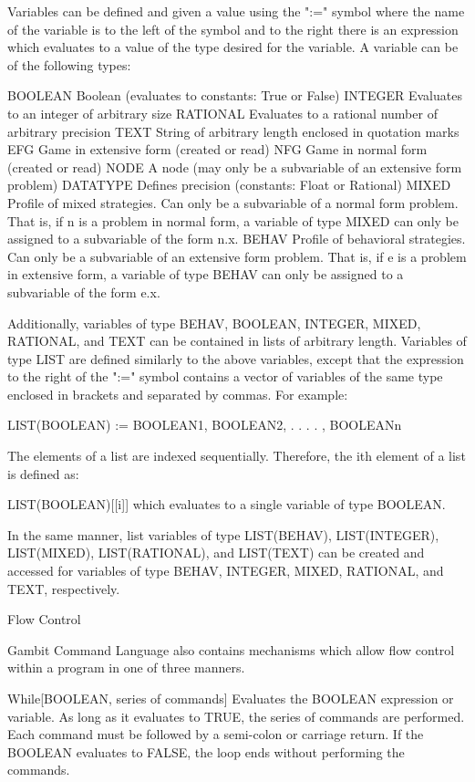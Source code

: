 Variables can be defined and given a value using the ":=" symbol where the name
of the variable is to the left of the symbol and to the right there is an
expression which evaluates to a value of the type desired for the variable.
A variable can be of the following types:

	BOOLEAN		Boolean (evaluates to constants:  True or False)
	INTEGER		Evaluates to an integer of arbitrary size
	RATIONAL	Evaluates to a rational number of arbitrary precision
	TEXT		String of arbitrary length enclosed in quotation marks
	EFG		Game in extensive form (created or read)
	NFG		Game in normal form (created or read)
	NODE		A node (may only be a subvariable of an extensive form
			problem)
	DATATYPE	Defines precision (constants:  Float or Rational)
	MIXED		Profile of mixed strategies.  Can only be a subvariable
			of a normal form problem.  That is, if n is a problem 
			in normal form, a variable of type MIXED can only be
			assigned to a subvariable of the form n.x.
	BEHAV		Profile of behavioral strategies.  Can only be a 
			subvariable of an extensive form problem.  That is, if 
			e is a problem in extensive form, a variable of type 
			BEHAV can only be assigned to a subvariable of the form
			e.x.

Additionally, variables of type BEHAV, BOOLEAN, INTEGER, MIXED, RATIONAL, and 
TEXT can be contained in lists of arbitrary length.  Variables of type LIST are
defined similarly to the above variables, except that the expression to the 
right of the ":=" symbol contains a vector of variables of the same type 
enclosed in brackets and separated by commas.  For example:

	LIST(BOOLEAN) := { BOOLEAN1, BOOLEAN2, . . . . , BOOLEANn }

The elements of a list are indexed sequentially.  Therefore, the ith element of
a list is defined as:

	LIST(BOOLEAN)[[i]]	which evaluates to a single variable of type 
				BOOLEAN.

In the same manner, list variables of type LIST(BEHAV), LIST(INTEGER), 
LIST(MIXED), LIST(RATIONAL), and LIST(TEXT) can be created and accessed for 
variables of type BEHAV, INTEGER, MIXED, RATIONAL, and TEXT, respectively.


Flow Control

Gambit Command Language also contains mechanisms which allow flow control 
within a program in one of three manners.

While[BOOLEAN, {series of commands}]	Evaluates the BOOLEAN expression or
					variable.  As long as it evaluates to
					TRUE, the series of commands are 
					performed.  Each command must be 
					followed by a semi-colon or carriage
					return.  If the BOOLEAN evaluates to 
					FALSE, the loop ends without performing
					the commands.


